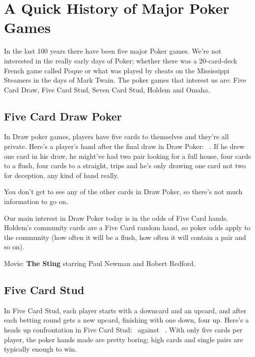 \chapter{A Quick History of Major Poker Games}

In the last 100 years there have been five major Poker games. We're
not interested in the really early days of Poker; whether there was a
20-card-deck French game called Poque or what was played by cheats on
the Mississippi Steamers in the days of Mark Twain. The poker games
that interest us are: Five Card Draw, Five Card Stud, Seven Card Stud,
Holdem and Omaha.


\section{Five Card Draw Poker}

In Draw poker games, players have five cards to themselves and they're
all private. Here's a player's hand after the final draw in Draw
Poker: \back\back\back\back\back\ . If he drew one card in his draw,
he might've had two pair looking for a full house, four cards to a
flush, four cards to a straight, trips and he's only drawing one card
not two for deception, any kind of hand really.

You don't get to see any of the other cards in Draw Poker, so there's
not much information to go on.

Our main interest in Draw Poker today is in the odds of Five Card
hands. Holdem's community cards are a Five Card random hand, so poker
odds apply to the community (how often it will be a flush, how often
it will contain a pair and so on).

Movie: \textbf{The Sting} starring Paul Newman and Robert Redford.

\section{Five Card Stud}

In Five Card Stud, each player starts with a downcard and an upcard,
and after each betting round gets a new upcard, finishing with one
down, four up. Here's a heads up confrontation in Five Card Stud:
\back\nines\Qc\Jc\tred\ against \back\fourh\Jh\tend\trec\ . With
only five cards per player, the poker hands made are pretty boring;
high cards and single pairs are typically enough to win.

